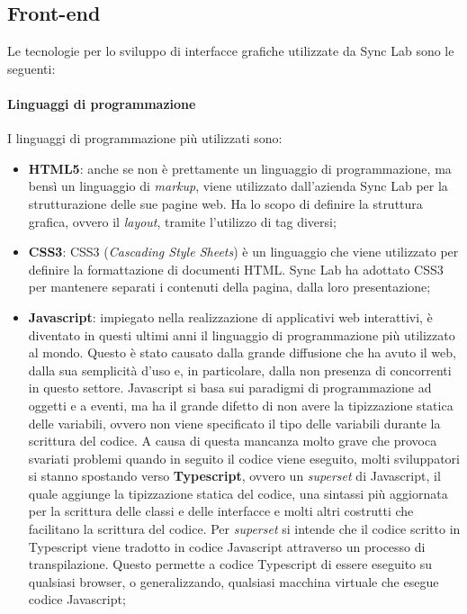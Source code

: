 \subsection{Front-end}
Le tecnologie per lo sviluppo di interfacce grafiche utilizzate da Sync Lab sono le seguenti:

\paragraph{Linguaggi di programmazione} 
I linguaggi di programmazione più utilizzati sono:
\begin{itemize}
  \item \textbf{HTML5}: anche se non è prettamente un linguaggio di programmazione, ma bensì un linguaggio di \textit{markup}, viene utilizzato dall'azienda Sync Lab per la strutturazione delle sue pagine web. Ha lo scopo di definire la struttura grafica, ovvero il \textit{layout}, tramite l'utilizzo di tag diversi;
  
  \item \textbf{CSS3}: CSS3 (\textit{Cascading Style Sheets}) è un linguaggio che viene utilizzato per definire la formattazione di documenti HTML. Sync Lab ha adottato CSS3 per mantenere separati i contenuti della pagina, dalla loro presentazione;

  \item \textbf{Javascript}: impiegato nella realizzazione di applicativi web interattivi, è diventato in questi ultimi anni il linguaggio di programmazione più utilizzato al mondo. Questo è stato causato dalla grande diffusione che ha avuto il web, dalla sua semplicità d'uso e, in particolare, dalla non presenza di concorrenti in questo settore. Javascript si basa sui paradigmi di programmazione ad oggetti e a eventi, ma ha il grande difetto di non avere la tipizzazione statica delle variabili, ovvero non viene specificato il tipo delle variabili durante la scrittura del codice. A causa di questa mancanza molto grave che provoca svariati problemi quando in seguito il codice viene eseguito, molti sviluppatori si stanno spostando verso \textbf{Typescript}, ovvero un \textit{superset} di Javascript, il quale aggiunge la tipizzazione statica del codice, una sintassi più aggiornata per la scrittura delle classi e delle interfacce e molti altri costrutti che facilitano la scrittura del codice. Per \textit{superset} si intende che il codice scritto in Typescript viene tradotto in codice Javascript attraverso un processo di transpilazione. Questo permette a codice Typescript di essere eseguito su qualsiasi browser, o generalizzando, qualsiasi macchina virtuale che esegue codice Javascript;
  

\end{itemize}
